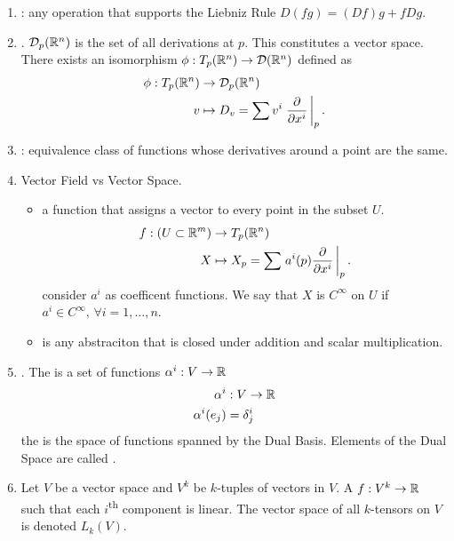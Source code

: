 \documentclass[10pt,a4paper]{report}
\begin{document}
\begin{enumerate}
	Let $p=(x^1, \dots, x^n)$.  The directional deriviative for each component would be described as
	\begin{align*}
		\RBAR{\PART{}{x^1}}_p& \\
		\text{notice } \ABRACKET{\PART{}{x^i}, \PART{}{x^j}} &= \delta_j^i, \forall p.
	\end{align*}that is perpendicular and form a orthogonal basis.  Thus, a Tangent Vector is also called a "Derivation".
	\item {}: any operation that supports the Liebniz Rule $D(fg) = (Df)g+fDg$.
	\item {}. $\mathcal{D}_p(\mathbb{R}^n)$ is the set of all derivations at $p$.  This constitutes a vector space.  There exists an isomorphism $\phi: T_p(\mathbb{R}^n) \to \mathcal{D}(\mathbb{R}^n)$ defined as
	\begin{align*}
		\phi: T_p(\mathbb{R}^n) &\to \mathcal{D}_p(\mathbb{R}^n)\\
		v &\mapsto D_v=\sum v^i \left . \frac{\partial }{\partial x^i} \, \right |_p.
	\end{align*}
	\item {}: equivalence class of functions whose derivatives around a point are the same.
	\item Vector Field vs Vector Space.  
	\begin{itemize}
		\item {} a function that assigns a vector to every point in the subset $U$. 
		\begin{align*}
			f: (U\subset \mathbb{R}^m) &\to T_p( \mathbb{R}^n) \\
				X &\mapsto X_p=\sum \left . a^i(p) \frac{\partial }{\partial x^i}  \, \right |_p.
		\end{align*}consider $a^i$ as coefficent functions.  We say that $X$ is $C^\infty$ on $U$ if $a^i\in C^\infty, \, \forall i=1,\dots,n$.
		\item {} is any abstraciton that is closed under addition and scalar multiplication.
	\end{itemize}
	\item {}.  The  is a set of functions $\alpha^i: V \to \mathbb{R}$ 
	\begin{align*}
		\alpha^i &: V \to \mathbb{R} \\
			\alpha^i(e_j) &= \delta_j^i
	\end{align*}the  is the space of functions spanned by the Dual Basis. Elements of the Dual Space are called .  
	\item {} Let $V$ be a vector space and $V^k$ be $k$-tuples of vectors in $V$. A  $f: V^k \to \mathbb{R}$ such that each $i$\textsuperscript{th} component is linear.  The vector space of all $k$-tensors on $V$ is denoted $L_k(V)$.
	

\end{enumerate}
\end{document}
